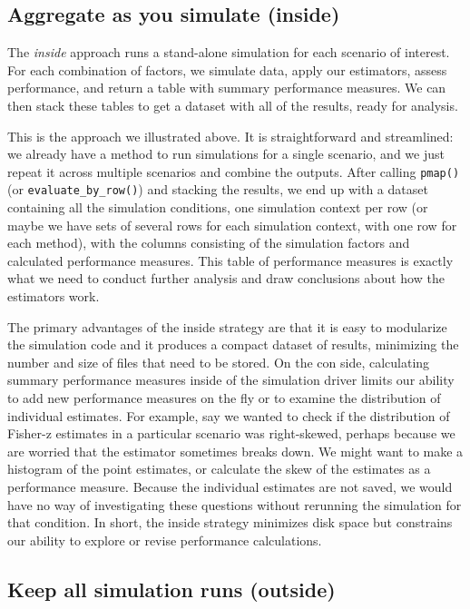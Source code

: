 \documentclass[
]{book}
\begin{document}
\subsection{Aggregate as you simulate (inside)}\label{aggregate-as-you-simulate-inside}

The \emph{inside} approach runs a stand-alone simulation for each scenario of interest. For each combination of factors, we simulate data, apply our estimators, assess performance, and return a table with summary performance measures. We can then stack these tables to get a dataset with all of the results, ready for analysis.

This is the approach we illustrated above. It is straightforward and streamlined: we already have a method to run simulations for a single scenario, and we just repeat it across multiple scenarios and combine the outputs.
After calling \texttt{pmap()} (or \texttt{evaluate\_by\_row()}) and stacking the results, we end up with a dataset containing all the simulation conditions, one simulation context per row (or maybe we have sets of several rows for each simulation context, with one row for each method), with the columns consisting of the simulation factors and calculated performance measures.
This table of performance measures is exactly what we need to conduct further analysis and draw conclusions about how the estimators work.

The primary advantages of the inside strategy are that it is easy to modularize the simulation code and it produces a compact dataset of results, minimizing the number and size of files that need to be stored.
On the con side, calculating summary performance measures inside of the simulation driver limits our ability to add new performance measures on the fly or to examine the distribution of individual estimates.
For example, say we wanted to check if the distribution of Fisher-z estimates in a particular scenario was right-skewed, perhaps because we are worried that the estimator sometimes breaks down.
We might want to make a histogram of the point estimates, or calculate the skew of the estimates as a performance measure.
Because the individual estimates are not saved, we would have no way of investigating these questions without rerunning the simulation for that condition.
In short, the inside strategy minimizes disk space but constrains our ability to explore or revise performance calculations.

\subsection{Keep all simulation runs (outside)}\label{keep-all-simulation-runs-outside}
\end{document}
